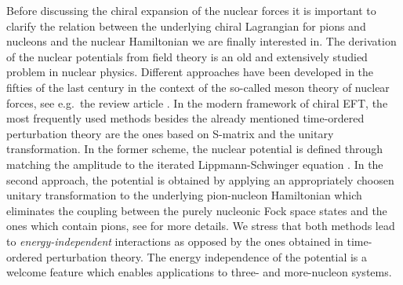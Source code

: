 \documentclass[aps,rmp,nofootinbib,twocolumn,floatfix]{revtex4}
\begin{document}
Before discussing the chiral expansion of the nuclear forces it is
important to clarify the relation between the underlying
chiral Lagrangian for pions and nucleons and the nuclear Hamiltonian we are
finally interested in. The derivation of the nuclear potentials from field theory is an old
and extensively studied problem in nuclear physics. Different approaches have
been developed in the fifties of the last century in the context of the
so-called meson theory of nuclear forces, see e.g.~the review article 
\cite{Phillips:1959aa}. In the modern framework of chiral EFT, the most
frequently used methods besides the already mentioned time-ordered perturbation theory
are the ones based on S-matrix and the unitary transformation. In the former
scheme, the nuclear potential is defined through matching the amplitude to the
iterated Lippmann-Schwinger equation \cite{Kaiser:1997mw}. In the
second approach, the 
potential is obtained by applying an appropriately choosen unitary transformation 
to the underlying pion-nucleon Hamiltonian which eliminates the coupling
between the purely nucleonic Fock space states and the ones which contain pions, see
\cite{Epelbaum:1998ka} for more details. We stress that both methods lead
to \emph{energy-independent} interactions as opposed by the ones obtained in
time-ordered perturbation theory. The energy independence of the potential is
a welcome feature which enables applications to three- and
more-nucleon systems.   
\end{document}
